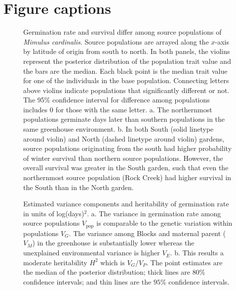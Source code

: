 \documentclass[
  12pt,
]{article}
\begin{document}
\hypertarget{figure-captions}{%
\section{Figure captions}\label{figure-captions}}

\begin{figure} [ht]
  \caption{Germination rate and survival differ among source populations of \textit{Mimulus cardinalis}. Source populations are arrayed along the $x$-axis by latitude of origin from south to north. In both panels, the violins represent the posterior distribution of the population trait value and the bars are the median. Each black point is the median trait value for one of the individuals in the base population. Connecting letters above violins indicate populations that significantly different or not. The 95\% confidence interval for difference among populations includes 0 for those with the same letter. a. The northernmost populations germinate days later than southern populations in the same greenhouse environment. b. In both South (solid linetype around violin) and North (dashed linetype around violin) gardens, source populations originating from the south had higher probability of winter survival than northern source populations. However, the overall survival was greater in the South garden, such that even the northernmost source population (Rock Creek) had higher survival in the South than in the North garden.}
\end{figure}

\begin{figure}[ht]
  \caption{Estimated variance components and heritability of germination rate in units of log(days)$^2$. a. The variance in germination rate among source populations $V_\text{pop}$ is comparable to the genetic variation within populations $V_G$. The variance among Blocks and maternal parent ($V_M$) in the greenhouse is substantially lower whereas the unexplained environmental variance is higher $V_E$. b. This results a moderate heritability $H^2$ which is $V_G / V_P$. The point estimates are the median of the posterior distribution; thick lines are $80$\% confidence intervals; and thin lines are the $95$\% confidence intervals.}
  \label{fig:h2-germ}
\end{figure}
\end{document}
